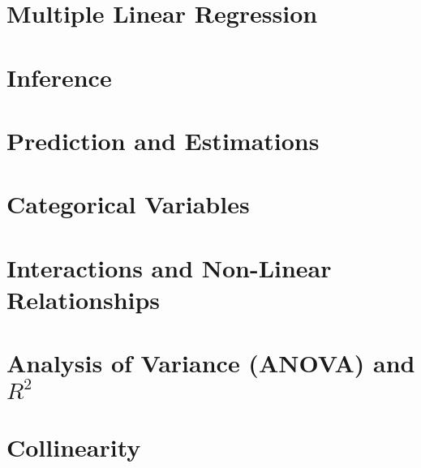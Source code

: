 \documentclass[11pt,fleqn]{book} %
\begin{document}

\section{Multiple Linear Regression}


\section{Inference}


\section{Prediction and Estimations}


\section{Categorical Variables}


\section{Interactions and Non-Linear Relationships}


\section{Analysis of Variance (ANOVA) and \(R^2\)}


\section{Collinearity}


\end{document}
